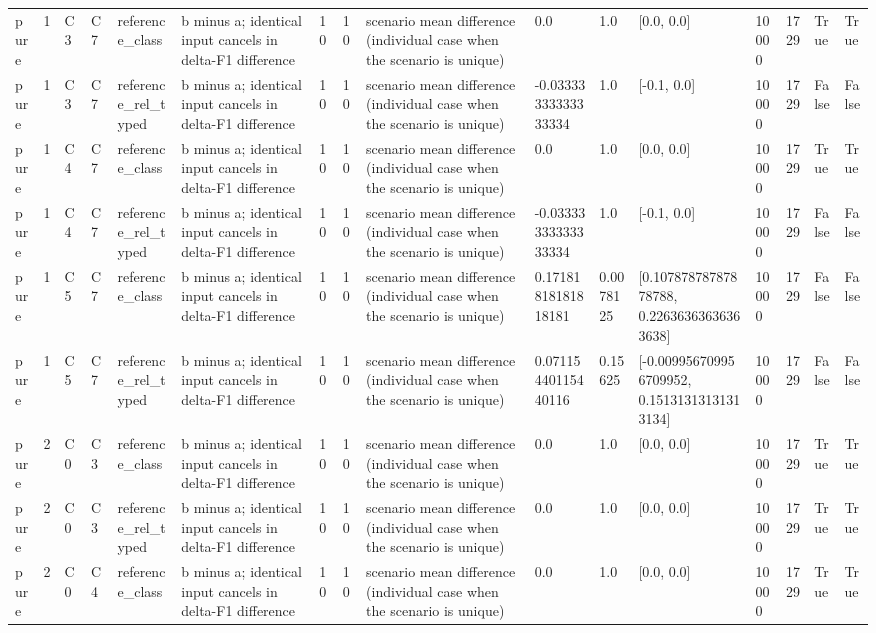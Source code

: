 \begin{tabular}{llllllllllllllll}
pure & 1 & C3 & C7 & reference\_class & b minus a; identical input cancels in delta-F1 difference & 10 & 10 & scenario mean difference (individual case when the scenario is unique) & 0.0 & 1.0 & [0.0, 0.0] & 10000 & 1729 & True & True \\
pure & 1 & C3 & C7 & reference\_rel\_typed & b minus a; identical input cancels in delta-F1 difference & 10 & 10 & scenario mean difference (individual case when the scenario is unique) & -0.03333333333333334 & 1.0 & [-0.1, 0.0] & 10000 & 1729 & False & False \\
pure & 1 & C4 & C7 & reference\_class & b minus a; identical input cancels in delta-F1 difference & 10 & 10 & scenario mean difference (individual case when the scenario is unique) & 0.0 & 1.0 & [0.0, 0.0] & 10000 & 1729 & True & True \\
pure & 1 & C4 & C7 & reference\_rel\_typed & b minus a; identical input cancels in delta-F1 difference & 10 & 10 & scenario mean difference (individual case when the scenario is unique) & -0.03333333333333334 & 1.0 & [-0.1, 0.0] & 10000 & 1729 & False & False \\
pure & 1 & C5 & C7 & reference\_class & b minus a; identical input cancels in delta-F1 difference & 10 & 10 & scenario mean difference (individual case when the scenario is unique) & 0.17181818181818181 & 0.0078125 & [0.10787878787878788, 0.22636363636363638] & 10000 & 1729 & False & False \\
pure & 1 & C5 & C7 & reference\_rel\_typed & b minus a; identical input cancels in delta-F1 difference & 10 & 10 & scenario mean difference (individual case when the scenario is unique) & 0.07115440115440116 & 0.15625 & [-0.009956709956709952, 0.15131313131313134] & 10000 & 1729 & False & False \\
pure & 2 & C0 & C3 & reference\_class & b minus a; identical input cancels in delta-F1 difference & 10 & 10 & scenario mean difference (individual case when the scenario is unique) & 0.0 & 1.0 & [0.0, 0.0] & 10000 & 1729 & True & True \\
pure & 2 & C0 & C3 & reference\_rel\_typed & b minus a; identical input cancels in delta-F1 difference & 10 & 10 & scenario mean difference (individual case when the scenario is unique) & 0.0 & 1.0 & [0.0, 0.0] & 10000 & 1729 & True & True \\
pure & 2 & C0 & C4 & reference\_class & b minus a; identical input cancels in delta-F1 difference & 10 & 10 & scenario mean difference (individual case when the scenario is unique) & 0.0 & 1.0 & [0.0, 0.0] & 10000 & 1729 & True & True \\

\end{tabular}

